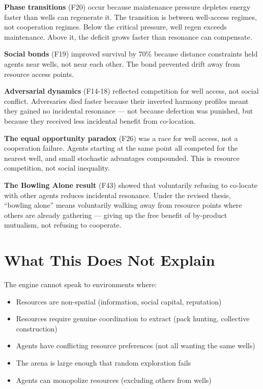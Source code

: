 \textbf{Phase transitions} (F20) occur because maintenance pressure depletes energy faster than wells can regenerate it. The transition is between well-access regimes, not cooperation regimes. Below the critical pressure, well regen exceeds maintenance. Above it, the deficit grows faster than resonance can compensate.

\textbf{Social bonds} (F19) improved survival by 70\% because distance constraints held agents near wells, not near each other. The bond prevented drift away from resource access points.

\textbf{Adversarial dynamics} (F14-18) reflected competition for well access, not social conflict. Adversaries died faster because their inverted harmony profiles meant they gained no incidental resonance --- not because defection was punished, but because they received less incidental benefit from co-location.

\textbf{The equal opportunity paradox} (F26) was a race for well access, not a cooperation failure. Agents starting at the same point all competed for the nearest well, and small stochastic advantages compounded. This is resource competition, not social inequality.

\textbf{The Bowling Alone result} (F43) showed that voluntarily refusing to co-locate with other agents reduces incidental resonance. Under the revised thesis, ``bowling alone'' means voluntarily walking away from resource points where others are already gathering --- giving up the free benefit of by-product mutualism, not refusing to cooperate.

\section{What This Does Not Explain}\label{what-this-does-not-explain}

The engine cannot speak to environments where:

\begin{itemize}
\tightlist
\item
  Resources are non-spatial (information, social capital, reputation)
\item
  Resources require genuine coordination to extract (pack hunting, collective construction)
\item
  Agents have conflicting resource preferences (not all wanting the same wells)
\item
  The arena is large enough that random exploration fails
\item
  Agents can monopolize resources (excluding others from wells)
\end{itemize}

